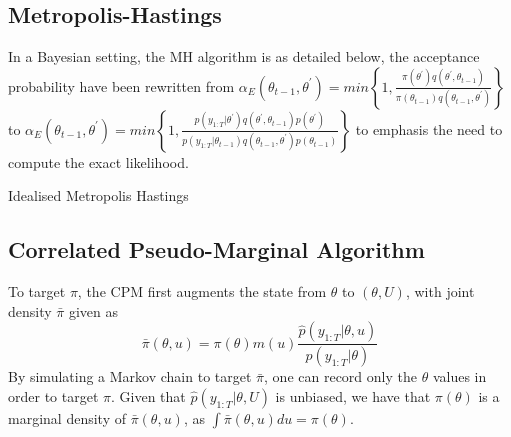 \documentclass{article}
\makeatletter
\def\BState{\State\hskip-\ALG@thistlm}
\makeatother
\begin{document}
\subsection{Metropolis-Hastings}
In a Bayesian setting, the MH algorithm is as detailed below, the acceptance probability have been rewritten from $\alpha_E(\theta_{t-1}, \theta^\prime) = min\left\{1,  \frac{
                \pi(\theta^\prime) q(\theta^\prime, \theta_{t-1})}
                {\pi(\theta_{t-1}) q(\theta_{t-1}, \theta^\prime)}\right\}$ to
 $ \alpha_E(\theta_{t-1}, \theta^\prime) = min\left\{1,  \frac{
                p(y_{1:T}| \theta^\prime) q(\theta^\prime, \theta_{t-1})p(\theta^\prime)}
                {p(y_{1:T}| \theta_{t-1}) q(\theta_{t-1}, \theta^\prime)p(\theta_{t-1})}
\right\} $ to emphasis the need to compute the exact likelihood.

\begin{algorithm}[H]
\caption{Idealised Metropolis Hastings}\label{euclid}
\end{algorithm}


\subsection{Correlated Pseudo-Marginal Algorithm} \label{cpm}
To target $\pi$, the CPM first augments the state from $\theta$ to $(\theta, U)$, with joint density $\bar{\pi}$ given as
$$\bar{\pi}(\theta, u) = \pi(\theta)m(u)\frac{\hat{p}(y_{1:T}| \theta, u)}{p(y_{1:T}| \theta)}$$
By simulating a Markov chain to target $\bar{\pi}$, one can record only the $\theta$ values in order to target $\pi$. Given that $\hat{p} (y_{1:T} | \theta, U)$ is unbiased, we have that $\pi(\theta)$ is a marginal density of $\bar{\pi} (\theta, u)$, as $\int \bar{\pi}(\theta,u)du = \pi(\theta)$. \\
\end{document}
